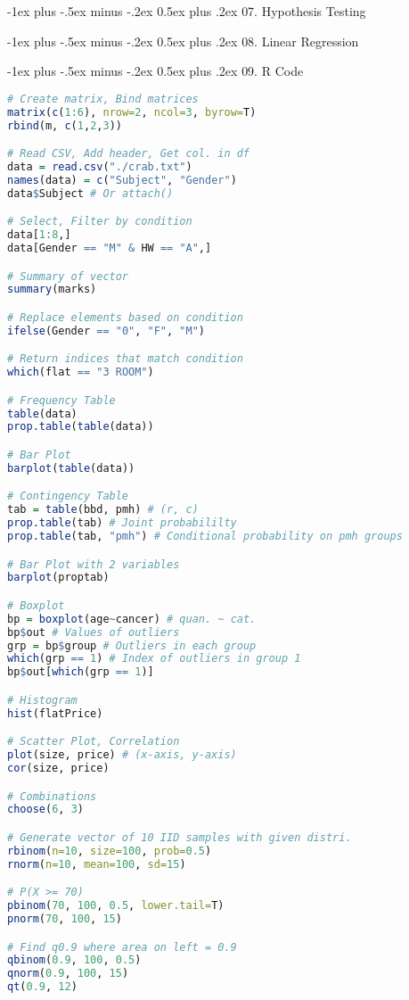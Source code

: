\documentclass{article}
\makeatletter
\renewcommand{\section}{\@startsection{section}{1}{0mm}%
  {-1ex plus -.5ex minus -.2ex}%
  {0.5ex plus .2ex}%
{\normalfont\large\bfseries}}
\makeatother
\begin{document}
\begin{multicols*}{4}
\section{07. Hypothesis Testing}

\section{08. Linear Regression}

\section{09. R Code}

\begin{lstlisting}[language=R, breaklines=true]
# Create matrix, Bind matrices
matrix(c(1:6), nrow=2, ncol=3, byrow=T)
rbind(m, c(1,2,3))

# Read CSV, Add header, Get col. in df
data = read.csv("./crab.txt")
names(data) = c("Subject", "Gender")
data$Subject # Or attach()

# Select, Filter by condition
data[1:8,]
data[Gender == "M" & HW == "A",]

# Summary of vector
summary(marks)

# Replace elements based on condition
ifelse(Gender == "0", "F", "M")

# Return indices that match condition
which(flat == "3 ROOM")

# Frequency Table
table(data)
prop.table(table(data))

# Bar Plot
barplot(table(data))

# Contingency Table 
tab = table(bbd, pmh) # (r, c)
prop.table(tab) # Joint probabililty
prop.table(tab, "pmh") # Conditional probability on pmh groups

# Bar Plot with 2 variables
barplot(proptab)

# Boxplot
bp = boxplot(age~cancer) # quan. ~ cat.
bp$out # Values of outliers
grp = bp$group # Outliers in each group
which(grp == 1) # Index of outliers in group 1
bp$out[which(grp == 1)] 

# Histogram
hist(flatPrice)

# Scatter Plot, Correlation
plot(size, price) # (x-axis, y-axis)
cor(size, price)

# Combinations
choose(6, 3)

# Generate vector of 10 IID samples with given distri.
rbinom(n=10, size=100, prob=0.5)
rnorm(n=10, mean=100, sd=15)

# P(X >= 70)
pbinom(70, 100, 0.5, lower.tail=T)
pnorm(70, 100, 15)

# Find q0.9 where area on left = 0.9
qbinom(0.9, 100, 0.5)
qnorm(0.9, 100, 15)
qt(0.9, 12)

\end{lstlisting}

\end{multicols*}
\end{document}
